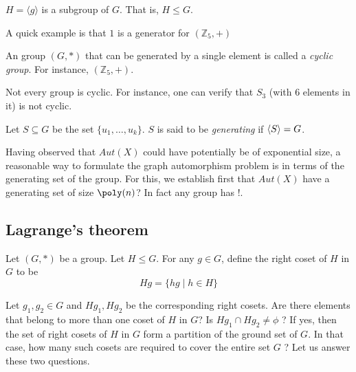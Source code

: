 \begin{observation}$H = \langle g \rangle$ is a subgroup of $G$. That is, $H\leq G$.
\end{observation}

A quick example is that $1$ is a generator for $(\mathbb{Z}_5,+)$



\begin{definition}
An group $(G,*)$ that can be generated by a single element is called a {\em cyclic group}. For instance, $(\mathbb{Z}_5,+)$.
\end{definition}

Not every group is cyclic. For instance, one can verify that $S_3$ (with 6 elements in it) is not cyclic. 

\begin{definition}
Let $S\subseteq G$ be the set $\{u_1,\ldots,u_k\}$. $S$ is said to be {\em generating} if $\left\langle S \right\rangle = G$.  
\end{definition}

Having observed that $Aut(X)$ could have potentially be of exponential size, a reasonable way to formulate the graph automorphism problem is in terms of the generating set of the group. For this, we establish first that $Aut(X)$ have a generating set of size $\poly(n)$? In fact any group has !.

\subsection{Lagrange's theorem}

Let $(G,*)$ be a group. Let $H\leq G$. For any $g\in G$, define the right coset of $H$ in $G$ to be
$$Hg= \{hg \mid h\in H \}$$

Let $g_1,g_2\in G$ and $Hg_1,Hg_2$ be the corresponding right cosets.  Are there elements that belong to more than one coset of $H$ in $G$? Is $Hg_1\cap Hg_2 \neq \phi$ ? If yes, then the set of right cosets of $H$ in $G$ form a partition of the ground set of $G$. In that case, how many such cosets are required to cover the entire set $G$ ? Let us answer these two questions.


